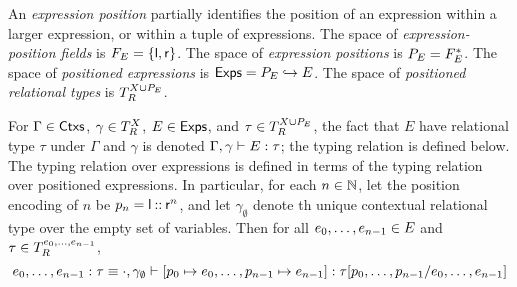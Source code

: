 An \emph{expression position} partially identifies the position of an
expression within a larger expression, or within a tuple of
expressions.
%
The space of \emph{expression-position fields} is
$\expposfields = \elts{ \leftchild, \rightchild }$.
%
The space of \emph{expression positions} is
$\exppos = \expposfields^{*}$.
%
The space of \emph{positioned expressions} is
$\posexps = \exppos \partto \expr$.
% 
The space of \emph{positioned relational types} is
$\reltypes{\vars \union \exppos}$.

For $\Gamma \in \ctxs$, $\gamma \in \ctxreltypes$, $E \in \posexps$,
and $\tau \in \posreltypes$, the fact that $E$ have relational type
$\tau$ under $\Gamma$ and $\gamma$ is denoted
$\Gamma, \gamma \judges E : \tau$;
%
the typing relation is defined below.
%
The typing relation over expressions is defined in terms of the typing
relation over positioned expressions.
%
In particular, for each $n \in \nats$, let the position encoding of
$n$ be $\pos{n} = \leftchild \cons \rightchild^{n}$, and let
$\gamma_{\emptyset}$ denote th unique contextual relational type over
the empty set of variables.
%
Then for all $e_0, \ldots, e_{n - 1} \in \expr$ and
$\tau \in \reltypes{ e_0, \ldots, e_{n - 1} }$,
\[ e_0, \ldots, e_{n - 1} : \tau \equiv \cdot, \gamma_{\emptyset}
  \judges [ \pos{0} \mapsto e_0, \ldots, \pos{n - 1} \mapsto e_{n - 1}
  ] : \replace{ \tau }{ e_0, \ldots, e_{n - 1} }{ \pos{0}, \ldots,
    \pos{n - 1} } \]

